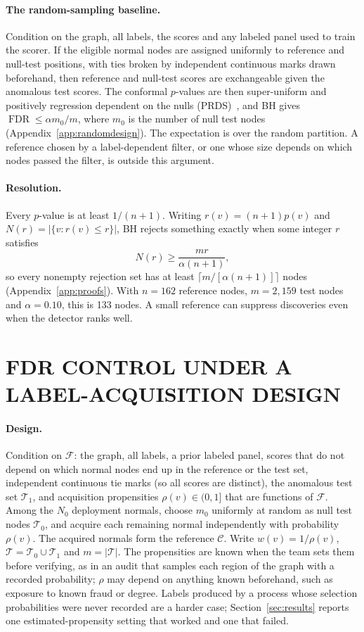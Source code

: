 \documentclass[twoside]{article}
\newcommand{\FDR}{\operatorname{FDR}}
\newcommand{\calset}{\mathcal{C}}
\newcommand{\testset}{\mathcal{T}}
\begin{document}
\paragraph{The random-sampling baseline.}
Condition on the graph, all labels, the scores and any labeled panel used to train the scorer. If the eligible normal nodes are assigned uniformly to reference and null-test positions, with ties broken by independent continuous marks drawn beforehand, then reference and null-test scores are exchangeable given the anomalous test scores. The conformal $p$-values are then super-uniform and positively regression dependent on the nulls (PRDS)~\citep[Theorem 3.3]{marandon2024adaptive}, and BH gives $\FDR\le\alpha m_0/m$, where $m_0$ is the number of null test nodes (Appendix~\ref{app:randomdesign}). The expectation is over the random partition. A reference chosen by a label-dependent filter, or one whose size depends on which nodes passed the filter, is outside this argument.

\paragraph{Resolution.}
Every $p$-value is at least $1/(n+1)$. Writing $r(v)=(n+1)p(v)$ and $N(r)=|\{v:r(v)\le r\}|$, BH rejects something exactly when some integer $r$ satisfies
\begin{equation}
N(r)\ge\frac{mr}{\alpha(n+1)},
\label{eq:crossing}
\end{equation}
so every nonempty rejection set has at least $\lceil m/[\alpha(n+1)]\rceil$ nodes (Appendix~\ref{app:proofs}). With $n=162$ reference nodes, $m=2{,}159$ test nodes and $\alpha=0.10$, this is 133 nodes. A small reference can suppress discoveries even when the detector ranks well.

\section{FDR CONTROL UNDER A LABEL-ACQUISITION DESIGN}
\label{sec:method}
\paragraph{Design.}
Condition on $\mathcal F$: the graph, all labels, a prior labeled panel, scores that do not depend on which normal nodes end up in the reference or the test set, independent continuous tie marks (so all scores are distinct), the anomalous test set $\testset_1$, and acquisition propensities $\rho(v)\in(0,1]$ that are functions of $\mathcal F$. Among the $N_0$ deployment normals, choose $m_0$ uniformly at random as null test nodes $\testset_0$, and acquire each remaining normal independently with probability $\rho(v)$. The acquired normals form the reference $\calset$. Write $w(v)=1/\rho(v)$, $\testset=\testset_0\cup\testset_1$ and $m=|\testset|$. The propensities are known when the team sets them before verifying, as in an audit that samples each region of the graph with a recorded probability; $\rho$ may depend on anything known beforehand, such as exposure to known fraud or degree. Labels produced by a process whose selection probabilities were never recorded are a harder case; Section~\ref{sec:results} reports one estimated-propensity setting that worked and one that failed.
\end{document}
